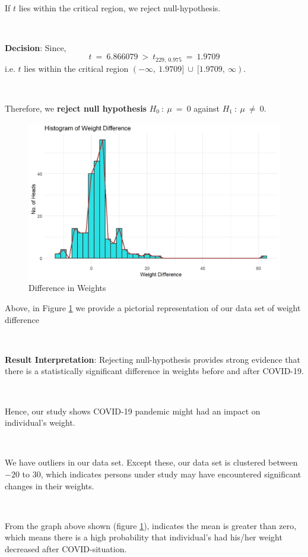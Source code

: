 \

If $t$ lies within the critical region, we reject null-hypothesis.

\ 

\textbf{Decision}: Since, 
$$t \ = \ 6.866079 \ > \ t_{229, \ 0.975} \ = \ 1.9709$$
i.e. $t$ lies within the critical region $(-\infty , \ 1.9709] \ \cup \ [1.9709, \ \infty)$. 

\

Therefore, we \textbf{reject null hypothesis} $H_{0} \ : \ \mu \ = \ 0$ against $H_{1} \ : \ \mu \ \neq \ 0$.

\begin{figure}[h!]
	\centering
	\includegraphics[width=0.7\linewidth]{IMAGES/Image 39.jpg}
	\caption{Difference in Weights}
	\label{G39}
\end{figure}

Above, in Figure \ref{G39} we provide a pictorial representation of our data set of weight difference

\

\textbf{Result Interpretation}: Rejecting null-hypothesis provides strong evidence that there is a statistically significant difference in weights before and after COVID-19.

\ 

Hence, our study shows COVID-19 pandemic might had an impact on individual's weight.
 
\ 

We have outliers in our data set. Except these, our data set is clustered between $-20$ to $30$, which indicates persons under study may have encountered significant changes in their weights.

\ 

From the graph above shown (figure \ref{G39}), indicates the mean is greater than zero, which means there is a high probability that individual's had his/her weight decreased after COVID-situation.
